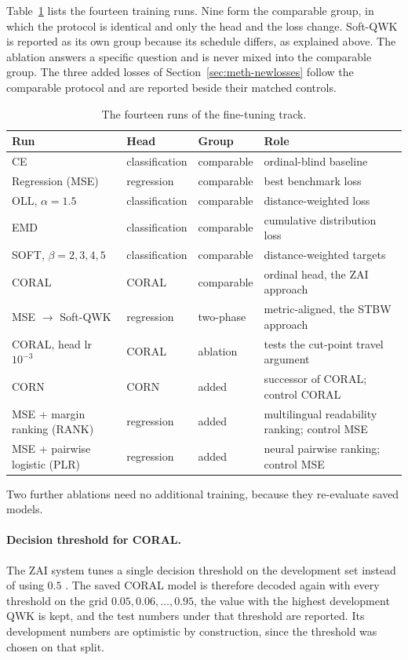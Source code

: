 Table~\ref{tab:meth-methods} lists the fourteen training runs. Nine form the comparable group,
in which the protocol is identical and only the head and the loss change. Soft-QWK is reported as
its own group because its schedule differs, as explained above. The ablation answers a specific
question and is never mixed into the comparable group. The three added losses of
Section~\ref{sec:meth-newlosses} follow the comparable protocol and are reported beside their
matched controls.

\begin{table}[H]
\centering
\footnotesize
\caption{The fourteen runs of the fine-tuning track.}
\label{tab:meth-methods}
\begin{tabular}{p{3.4cm} p{2.0cm} p{1.9cm} p{3.7cm}}
\toprule
\textbf{Run} & \textbf{Head} & \textbf{Group} & \textbf{Role} \\
\midrule
CE & classification & comparable & ordinal-blind baseline \\
Regression (MSE) & regression & comparable & best benchmark loss \\
OLL, $\alpha=1.5$ & classification & comparable & distance-weighted loss \\
EMD & classification & comparable & cumulative distribution loss \\
SOFT, $\beta=2,3,4,5$ & classification & comparable & distance-weighted targets \\
CORAL & CORAL & comparable & ordinal head, the ZAI approach \\
MSE $\rightarrow$ Soft-QWK & regression & two-phase & metric-aligned, the STBW approach \\
CORAL, head lr $10^{-3}$ & CORAL & ablation & tests the cut-point travel argument \\
CORN & CORN & added & successor of CORAL; control CORAL \\
MSE + margin ranking (RANK) & regression & added & multilingual readability ranking; control MSE
\\
MSE + pairwise logistic (PLR) & regression & added & neural pairwise ranking; control MSE \\
\bottomrule
\end{tabular}
\end{table}

Two further ablations need no additional training, because they re-evaluate saved models.

\paragraph{Decision threshold for CORAL.} The ZAI system tunes a single decision threshold on
the development set instead of using $0.5$ \cite{nazzal2025zai}. The saved CORAL model is
therefore decoded again with every threshold on the grid $0.05, 0.06, \dots, 0.95$, the value
with the highest development QWK is kept, and the test numbers under that threshold are
reported. Its development numbers are optimistic by construction, since the threshold was
chosen on that split.

